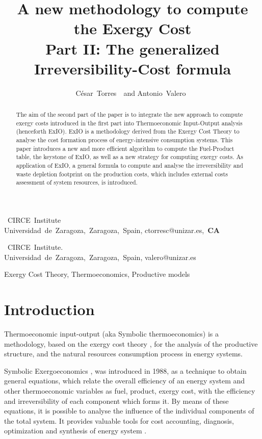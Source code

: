\documentclass{ecos2018}
\title{A new methodology to compute the Exergy Cost\\ Part II: The generalized Irreversibility-Cost formula}
\author{%
      \mbox{C\'esar Torres \refauth{a}}~and
      \mbox{Antonio Valero \refauth{b}}}
\begin{document}
\maketitle

\begin{address}
 \mbox{ CIRCE Institute} \\
 \mbox{Universidad de Zaragoza, Zaragoza, Spain,}
 \mbox{ctorresc@unizar.es, \textbf{CA}} \par
 \mbox{ CIRCE Institute.} \\
 \mbox{Universidad de Zaragoza, Zaragoza, Spain,}
 \mbox{valero@unizar.es} \par
\end{address}

\begin{abstract}%
\begin{spacing}{1.1}
The aim of the second part of the paper is to integrate the new approach to compute exergy costs introduced in the first part into Thermoeconomic Input-Output analysis (henceforth ExIO). ExIO is a methodology derived from the Exergy Cost Theory to analyse the cost formation process of energy-intensive
consumption systems. This paper introduces a new and more efficient algorithm to compute the Fuel-Product table, the keystone of ExIO, as well as a new strategy for computing exergy costs. 
As application of ExIO, a general formula to compute and analyse the irreversibility and waste depletion footprint on the production costs, which includes external costs assessment of system resources, is introduced.
\end{spacing}
\end{abstract}

\begin{keywords}
Exergy Cost Theory, Thermoeconomics, Productive models
\end{keywords}

\section{Introduction}
Thermoeconomic input-output (aka Symbolic thermoeconomics) is a methodology, based on the exergy cost theory \cite{Torres2017}, for the analysis of the productive structure, and the natural resources consumption process in energy systems.

Symbolic Exergoeconomics \cite{Torres1988}, was introduced in 1988, as a technique to obtain general equations, which relate the overall efficiency of an energy system and other thermoeconomic variables as fuel, product, exergy cost, with the efficiency and irreversibility of each component which forms it. By means of these equations, it is possible to analyse the influence of the individual components of the total system. It provides valuable tools for cost accounting, diagnosis, optimization and synthesis of energy system \cite{TADEUS2004,ISE2010}.
\end{document}
